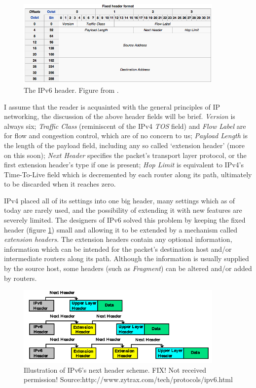 \documentclass[final,a4paper,twoside,11pt,onecolumn]{report}
\begin{document}
\begin{figure}[here]
   \includegraphics[width=0.9\textwidth]{wiki-ipv6-header}
   \caption{The IPv6 header. Figure from \cite{wiki:ipv6_packet}.}
   \label{fig:ipv6_packet}
\end{figure}

I assume that the reader is acquainted with the general principles of IP networking, the discussion of the above header fields will be brief. \emph{Version} is always six; \emph{Traffic Class} (reminiscent of the IPv4 \emph{TOS} field) and \emph{Flow Label} are for flow and congestion control, which are of no concern to us; \emph{Payload Length} is the length of the payload field, including any so called `extension header' (more on this soon); \emph{Next Header} specifies the packet's transport layer protocol, or the first extension header's type if one is present; \emph{Hop Limit} is equivalent to IPv4's Time-To-Live field which is decremented by each router along its path, ultimately to be discarded when it reaches zero.

IPv4 placed all of its settings into one big header, many settings which as of today are rarely used, and the possibility of extending it with new features are severely limited. The designers of IPv6 solved this problem by keeping the fixed header (figure \ref{fig:ipv6_packet}) small and allowing it to be extended by a mechanism called \emph{extension headers}. The extension headers contain any optional information, information which can be intended for the packet's destination host and/or intermediate routers along its path. Although the information is usually supplied by the source host, some headers (such as \emph{Fragment}) can be altered and/or added by routers.

\begin{figure}[here]
   \includegraphics[width=0.9\textwidth]{ipv6-nextheader}
   \caption{Illustration of IPv6's next header scheme. FIX! Not received permission! Source:http://www.zytrax.com/tech/protocols/ipv6.html}
   \label{fig:ipv6_nextheader}
\end{figure}
\end{document}
